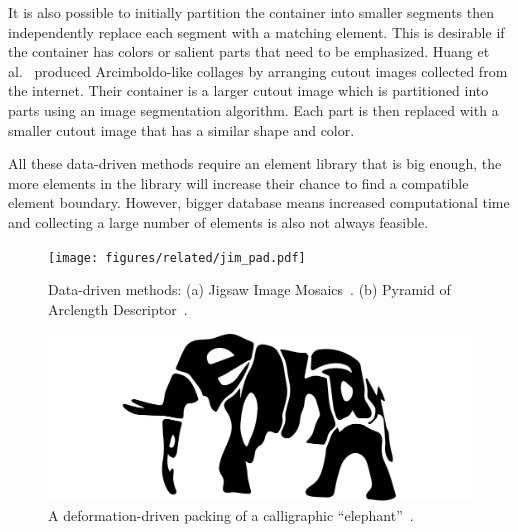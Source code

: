 \newtext
{
It is also possible to initially partition the container into smaller segments
then independently replace each segment with a matching element.
This is desirable if the container has colors or salient parts that need to be emphasized.
Huang et al.~\cite{Huang2011} produced Arcimboldo-like collages
by arranging cutout images collected from the internet.
Their container is a larger cutout image which is partitioned into parts
using an image segmentation algorithm.
Each part is then replaced with a smaller cutout image that has a similar shape and color.
}

\newtext
{
All these data-driven methods require an element library that is big enough,
the more elements in the library will increase their chance to find a compatible element boundary.
However, bigger database means increased computational time and
collecting a large number of elements is also not always feasible.
}

\begin{figure}
\centering
\texttt{[image: figures/related/jim\_pad.pdf]} 
\caption[Packing examples generated by JIM and PAD]
{\label{fig_related_jim_pad} 
\newtext
{
Data-driven methods:
(a) Jigsaw Image Mosaics~\cite{Kim2002}.
(b) Pyramid of Arclength Descriptor~\cite{Kwan2016}. 
}
}
\end{figure}




\begin{figure}
\centering
\includegraphics[width=1.0\textwidth]{figures/related/calligraphy.pdf} 
\caption[A calligraphy packing of an ``elephant'']
{\label{fig_calligraphy_packing} 
\newtext
{
A deformation-driven packing of a calligraphic ``elephant''~\cite{Xu2007}.
}
}
\end{figure}


